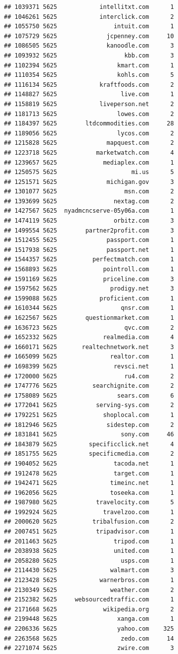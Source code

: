 \documentclass[
]{article}
\begin{document}
\begin{verbatim}
## 1039371 5625            intellitxt.com      1
## 1046261 5625            interclick.com      2
## 1055750 5625                intuit.com      1
## 1075729 5625              jcpenney.com     10
## 1086505 5625              kanoodle.com      3
## 1093932 5625                   kbb.com      3
## 1102394 5625                 kmart.com      1
## 1110354 5625                 kohls.com      5
## 1116134 5625            kraftfoods.com      2
## 1148827 5625                  live.com      1
## 1158819 5625            liveperson.net      2
## 1181713 5625                 lowes.com      2
## 1184397 5625        ltdcommodities.com     28
## 1189056 5625                 lycos.com      2
## 1215828 5625              mapquest.com      2
## 1223718 5625           marketwatch.com      4
## 1239657 5625             mediaplex.com      1
## 1250575 5625                     mi.us      5
## 1251571 5625              michigan.gov      3
## 1301077 5625                   msn.com      2
## 1393699 5625                nextag.com      2
## 1427567 5625  nyadmcncserve-05y06a.com      1
## 1474119 5625                orbitz.com      3
## 1499554 5625        partner2profit.com      3
## 1512455 5625              passport.com      1
## 1517938 5625              passport.net      1
## 1544357 5625          perfectmatch.com      1
## 1568893 5625             pointroll.com      1
## 1591169 5625             priceline.com      3
## 1597562 5625               prodigy.net      3
## 1599088 5625            proficient.com      1
## 1610344 5625                  qnsr.com      1
## 1622567 5625        questionmarket.com      1
## 1636723 5625                   qvc.com      2
## 1652332 5625             realmedia.com      4
## 1660171 5625       realtechnetwork.net      3
## 1665099 5625               realtor.com      1
## 1698399 5625                revsci.net      1
## 1720000 5625                   ru4.com      2
## 1747776 5625          searchignite.com      2
## 1758089 5625                 sears.com      6
## 1772041 5625           serving-sys.com      2
## 1792251 5625             shoplocal.com      1
## 1812946 5625              sidestep.com      2
## 1831841 5625                  sony.com     46
## 1843879 5625         specificclick.net      4
## 1851755 5625         specificmedia.com      2
## 1904052 5625                tacoda.net      1
## 1912478 5625                target.com      1
## 1942471 5625               timeinc.net      1
## 1962056 5625               toseeka.com      1
## 1987980 5625           travelocity.com      5
## 1992924 5625             travelzoo.com      1
## 2000620 5625          tribalfusion.com      2
## 2007451 5625           tripadvisor.com      1
## 2011463 5625                tripod.com      1
## 2038938 5625                united.com      1
## 2058280 5625                  usps.com      1
## 2114430 5625               walmart.com      3
## 2123428 5625            warnerbros.com      1
## 2130349 5625               weather.com      2
## 2152382 5625     websourcedtraffic.com      1
## 2171668 5625             wikipedia.org      2
## 2199448 5625                 xanga.com      1
## 2206336 5625                 yahoo.com    325
## 2263568 5625                  zedo.com     14
## 2271074 5625                 zwire.com      3
\end{verbatim}
\end{document}
